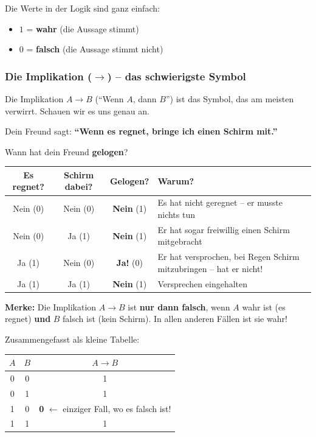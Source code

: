 \documentclass[a4paper,12pt]{article}
\begin{document}
\begin{merkbox}
Die Werte in der Logik sind ganz einfach:
\begin{itemize}
\item $1$ = \textbf{wahr} (die Aussage stimmt)
\item $0$ = \textbf{falsch} (die Aussage stimmt nicht)
\end{itemize}
\end{merkbox}

\subsubsection*{Die Implikation ($\to$) -- das schwierigste Symbol}

Die Implikation $A \to B$ ("`Wenn $A$, dann $B$"') ist das Symbol, das am meisten verwirrt. Schauen wir es uns genau an.

\begin{analogie}[title={Analogie: Regenversprechen}]
Dein Freund sagt: \textbf{"`Wenn es regnet, bringe ich einen Schirm mit."'}

Wann hat dein Freund \textbf{gelogen}?

\medskip
\renewcommand{\arraystretch}{1.4}
\begin{tabular}{cc|c|l}
Es regnet? & Schirm dabei? & Gelogen? & Warum? \\
\midrule
Nein (0) & Nein (0) & \textbf{Nein} (1) & Es hat nicht geregnet -- er musste nichts tun \\
Nein (0) & Ja (1) & \textbf{Nein} (1) & Er hat sogar freiwillig einen Schirm mitgebracht \\
Ja (1) & Nein (0) & \textbf{Ja!} (0) & Er hat versprochen, bei Regen Schirm mitzubringen -- hat er nicht! \\
Ja (1) & Ja (1) & \textbf{Nein} (1) & Versprechen eingehalten \\
\end{tabular}

\medskip
\textbf{Merke:} Die Implikation $A \to B$ ist \textbf{nur dann falsch}, wenn $A$ wahr ist (es regnet) \textbf{und} $B$ falsch ist (kein Schirm). In allen anderen F\"allen ist sie wahr!
\end{analogie}

Zusammengefasst als kleine Tabelle:

\begin{center}
\begin{tabular}{cc|c}
$A$ & $B$ & $A \to B$ \\
\midrule
0 & 0 & 1 \\
0 & 1 & 1 \\
1 & 0 & \textbf{0} $\leftarrow$ einziger Fall, wo es falsch ist! \\
1 & 1 & 1 \\
\end{tabular}
\end{center}
\end{document}
